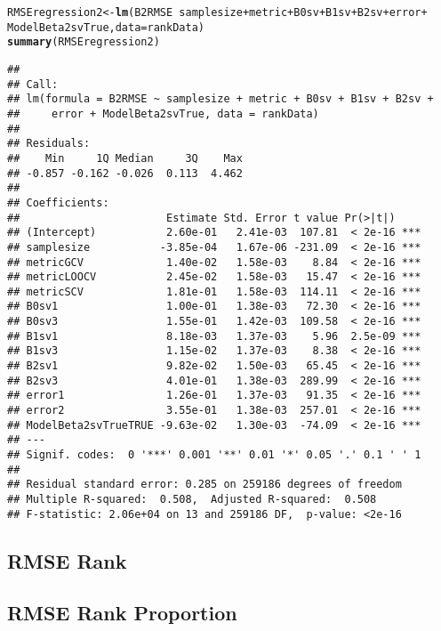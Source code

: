 \documentclass{article}\usepackage[]{graphicx}\usepackage[]{color}
\makeatletter
\newcommand{\hlopt}[1]{\textcolor[rgb]{0,0,0}{#1}}%
\newcommand{\hlstd}[1]{\textcolor[rgb]{0.345,0.345,0.345}{#1}}%
\newcommand{\hlkwb}[1]{\textcolor[rgb]{0.69,0.353,0.396}{#1}}%
\newcommand{\hlkwc}[1]{\textcolor[rgb]{0.333,0.667,0.333}{#1}}%
\newcommand{\hlkwd}[1]{\textcolor[rgb]{0.737,0.353,0.396}{\textbf{#1}}}%
\newenvironment{kframe}{%
 \def\at@end@of@kframe{}%
 \ifinner\ifhmode%
  \def\at@end@of@kframe{\end{minipage}}%
  \begin{minipage}{\columnwidth}%
 \fi\fi%
 \def\FrameCommand##1{\hskip\@totalleftmargin \hskip-\fboxsep
 \colorbox{shadecolor}{##1}\hskip-\fboxsep
     \hskip-\linewidth \hskip-\@totalleftmargin \hskip\columnwidth}%
 \MakeFramed {\advance\hsize-\width
   \@totalleftmargin\z@ \linewidth\hsize
   \@setminipage}}%
 {\par\unskip\endMakeFramed%
 \at@end@of@kframe}
\newenvironment{knitrout}{}{} %
\makeatother
\begin{document}
\begin{knitrout}
\color{fgcolor}\begin{kframe}
\begin{alltt}
\hlstd{RMSEregression2} \hlkwb{<-} \hlkwd{lm}\hlstd{(B2RMSE} \hlopt{~} \hlstd{samplesize} \hlopt{+} \hlstd{metric} \hlopt{+} \hlstd{B0sv} \hlopt{+} \hlstd{B1sv} \hlopt{+} \hlstd{B2sv} \hlopt{+} \hlstd{error} \hlopt{+}
    \hlstd{ModelBeta2svTrue,} \hlkwc{data} \hlstd{= rankData)}
\hlkwd{summary}\hlstd{(RMSEregression2)}
\end{alltt}
\begin{verbatim}
## 
## Call:
## lm(formula = B2RMSE ~ samplesize + metric + B0sv + B1sv + B2sv + 
##     error + ModelBeta2svTrue, data = rankData)
## 
## Residuals:
##    Min     1Q Median     3Q    Max 
## -0.857 -0.162 -0.026  0.113  4.462 
## 
## Coefficients:
##                       Estimate Std. Error t value Pr(>|t|)    
## (Intercept)           2.60e-01   2.41e-03  107.81  < 2e-16 ***
## samplesize           -3.85e-04   1.67e-06 -231.09  < 2e-16 ***
## metricGCV             1.40e-02   1.58e-03    8.84  < 2e-16 ***
## metricLOOCV           2.45e-02   1.58e-03   15.47  < 2e-16 ***
## metricSCV             1.81e-01   1.58e-03  114.11  < 2e-16 ***
## B0sv1                 1.00e-01   1.38e-03   72.30  < 2e-16 ***
## B0sv3                 1.55e-01   1.42e-03  109.58  < 2e-16 ***
## B1sv1                 8.18e-03   1.37e-03    5.96  2.5e-09 ***
## B1sv3                 1.15e-02   1.37e-03    8.38  < 2e-16 ***
## B2sv1                 9.82e-02   1.50e-03   65.45  < 2e-16 ***
## B2sv3                 4.01e-01   1.38e-03  289.99  < 2e-16 ***
## error1                1.26e-01   1.37e-03   91.35  < 2e-16 ***
## error2                3.55e-01   1.38e-03  257.01  < 2e-16 ***
## ModelBeta2svTrueTRUE -9.63e-02   1.30e-03  -74.09  < 2e-16 ***
## ---
## Signif. codes:  0 '***' 0.001 '**' 0.01 '*' 0.05 '.' 0.1 ' ' 1
## 
## Residual standard error: 0.285 on 259186 degrees of freedom
## Multiple R-squared:  0.508,	Adjusted R-squared:  0.508 
## F-statistic: 2.06e+04 on 13 and 259186 DF,  p-value: <2e-16
\end{verbatim}
\end{kframe}
\end{knitrout}


\subsection{RMSE Rank}

\subsection{RMSE Rank Proportion}
\end{document}
